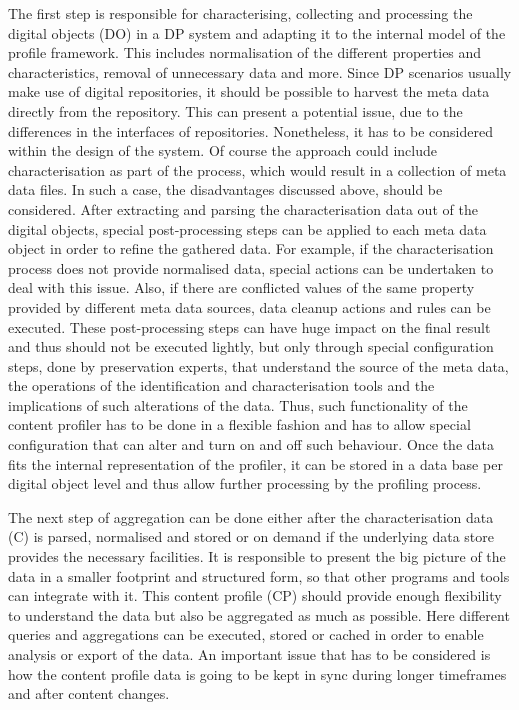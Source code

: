 The first step is responsible for characterising, collecting and processing the digital objects (DO) in a DP system and adapting it to the internal model of the profile framework. This includes normalisation of the different properties and characteristics, removal of unnecessary data and more. Since DP scenarios usually make use of digital repositories, it should be possible to harvest the meta data directly from the repository. This can present a potential issue, due to the differences in the interfaces of repositories. Nonetheless, it has to be considered within the design of the system. Of course the approach could include characterisation as part of the process, which would result in a collection of meta data files. In such a case, the disadvantages discussed above, should be considered. After extracting and parsing the characterisation data out of the digital objects, special post-processing steps can be applied to each meta data object in order to refine the gathered data. For example, if the characterisation process does not provide normalised data, special actions can be undertaken to deal with this issue. Also, if there are conflicted values of the same property provided by different meta data sources, data cleanup actions and rules can be executed. These post-processing steps can have huge impact on the final result and thus should not be executed lightly, but only through special configuration steps, done by preservation experts, that understand the source of the meta data, the operations of the identification and characterisation tools and the implications of such alterations of the data. Thus, such functionality of the content profiler has to be done in a flexible fashion and has to allow special configuration that can alter and turn on and off such behaviour. Once the data fits the internal representation of the profiler, it can be stored in a data base per digital object level and thus allow further processing by the profiling process.

The next step of aggregation can be done either after the characterisation data (C) is parsed, normalised and stored or on demand if the underlying data store provides the necessary facilities. It is responsible to present the big picture of the data in a smaller footprint and structured form, so that other programs and tools can integrate with it. This content profile (CP) should provide enough flexibility to understand the data but also be aggregated as much as possible. Here different queries and aggregations can be executed, stored or cached in order to enable analysis or export of the data. An important issue that has to be considered is how the content profile data is going to be kept in sync during longer timeframes and after content changes. 

